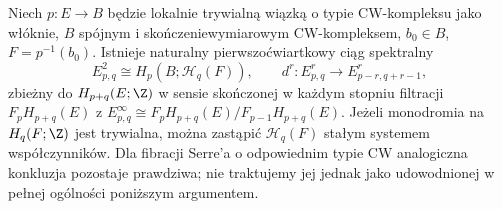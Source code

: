 \begin{twierdzenie}
\label{thm:serre-v5}
Niech $p:E\to B$ będzie lokalnie trywialną wiązką o typie
CW-kompleksu jako włóknie, $B$ spójnym i skończeniewymiarowym
CW-kompleksem, $b_0\in B$, $F=p^{-1}(b_0)$.
Istnieje naturalny pierwszoćwiartkowy ciąg spektralny
\[
E^2_{p,q}\cong H_p(B;\mathcal H_q(F)),\qquad
 d^r:E^r_{p,q}\longrightarrow E^r_{p-r,q+r-1},
\]
zbieżny do $H_{p+q}(E;\Z)$ w sensie skończonej w każdym
stopniu filtracji $F_pH_{p+q}(E)$ z
$E^\infty_{p,q}\cong F_pH_{p+q}(E)/F_{p-1}H_{p+q}(E)$.
Jeżeli monodromia na $H_q(F;\Z)$ jest trywialna, można
zastąpić $\mathcal H_q(F)$ stałym systemem współczynników.
Dla fibracji Serre'a o odpowiednim typie CW analogiczna
konkluzja pozostaje prawdziwa; nie traktujemy jej jednak
jako udowodnionej w pełnej ogólności poniższym argumentem.
\end{twierdzenie}
